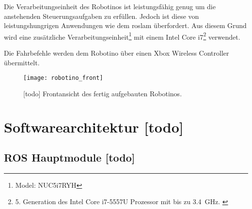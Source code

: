 Die Verarbeitungseinheit des Robotinos ist leistungsfähig genug um die anstehenden Steuerungsaufgaben zu erfüllen. Jedoch ist diese von leistungshungrigen Anwendungen wie dem \Gls{roslam} überfordert. Aus diesem Grund wird eine zusätzliche Verarbeitungseinheit\footnote{Model: NUC5i7RYH} mit einem Intel Core i7\footnote{5. Generation des Intel Core i7-5557U Prozessor mit bis zu \SI{3.4}{\GHz}. \cite{intel2015nucproductbrief}} verwendet.

Die Fahrbefehle werden dem Robotino über einen Xbox Wireless Controller übermittelt.

\begin{figure}[h]
	\centering
	\texttt{[image: robotino\_front]}
	\caption{[todo] Frontansicht des fertig aufgebauten Robotinos.}
	\label{fig:robotino_front}
\end{figure}


\begin{comment}
--------------------------------------------------------------------------------
- Kurzbeschreibung der Modulfunktion
- Welche Funktion erfüllt dieses Modul
- Welche ROS-Messages/-Topics/-Services bietet dieses Modul
\end{comment}
\section{Softwarearchitektur [todo]}


\begin{comment}
--------------------------------------------------------------------------------
- Begrifflichkeiten wie Topic, Sessage, Service usw. wurden bereits im Grundlagenkapitel geklärt.
- TODO: Grundlagen ROS: URDF, Lauch-Files, TF-Tree (odom, base_link, map?)
\end{comment}
\subsection{ROS Hauptmodule [todo]}


\begin{comment}
--------------------------------------------------------------------------------
"max_linear_vel", "min_linear_vel", "max_angular_vel", "min_angular_vel"

<node name="robotino_node" pkg="robotino_node" type="robotino_node" output="screen">
	<param name="hostname" value="$(arg hostname)" />
	<param name="max_linear_vel" value="0.5" />
	<param name="min_linear_vel" value="0.05" />
	<param name="max_angular_vel" value="3.0" />
	<param name="min_angular_vel" value="0.1" />
	<remap from="robotino_joint_states" to="joint_states" />
</node>

OmniDriveROS::OmniDriveROS()
{
	cmd_vel_sub_ = nh_.subscribe("cmd_vel", 1, &OmniDriveROS::cmdVelCallback, this);
}
\end{comment}
